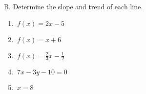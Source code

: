 B. Determine  the slope and trend  of each  line. 

\begin{enumerate}[label = \arabic*. ]

\item \hspce $\ { f(x)=2x-5}$ 
\item \hspce $\ { f(x)=x+6}$ 
\item \hspce $\ { f(x) =\displaystyle  \frac{2}{3}x-\displaystyle  \frac{1}{2} }$ 
\item \hspce $\ { 7x-3y-10 = 0 }$ 
\item \hspce $\ {x  = 8 }$ 

\end{enumerate}  